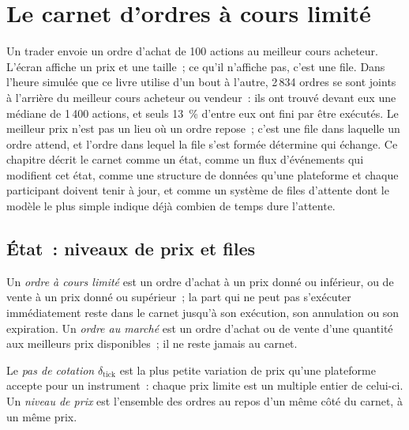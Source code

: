 \chapter{Le carnet d'ordres à cours limité}\label{ch:mx:the-limit-order-book}

Un trader envoie un ordre d'achat de 100 actions au meilleur cours acheteur. L'écran affiche un prix et une taille~; ce qu'il n'affiche pas, c'est une file. Dans
l'heure simulée que ce livre utilise d'un bout à l'autre, 2\,834 ordres se sont joints à l'arrière du meilleur cours acheteur ou vendeur~: ils ont trouvé devant
eux une médiane de 1\,400 actions, et seuls 13~\% d'entre eux ont fini par être exécutés. Le meilleur prix n'est pas un lieu où un ordre repose~; c'est une file dans
laquelle un ordre attend, et l'ordre dans lequel la file s'est formée détermine qui échange. Ce chapitre décrit le carnet comme un état, comme un flux d'événements qui modifient cet état, comme une
structure de données qu'une plateforme et chaque participant doivent tenir à jour, et comme un système de files d'attente dont le modèle le plus simple indique déjà combien de temps dure l'attente.

\section{État~: niveaux de prix et files}

\begin{definition}\label{def:mx:the-limit-order-book:orders}
Un \emph{ordre à cours limité} est un ordre d'achat à un prix donné ou inférieur, ou de vente à un prix donné ou supérieur~; la part
qui ne peut pas s'exécuter immédiatement reste dans le carnet jusqu'à son exécution, son annulation ou son expiration. Un \emph{ordre au marché} est un ordre
d'achat ou de vente d'une quantité aux meilleurs prix disponibles~; il ne reste jamais au carnet.
\end{definition}

\begin{definition}\label{def:mx:the-limit-order-book:tick}
Le \emph{pas de cotation} $\delta_{\mathrm{tick}}$ est la plus petite variation de prix qu'une plateforme accepte pour un instrument~: chaque prix limite
est un multiple entier de celui-ci. Un \emph{niveau de prix} est l'ensemble des ordres au repos d'un même côté du carnet, à un même prix.
\end{definition}

